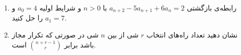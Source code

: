     \p 
\begin{enumerate}
\item
رابطه‌ی بازگشتی
$a_{n+2} - 5a_{n+1} + 6a_n = 2$
با
$n > 0$
و شرایط اولیه
$a_0 = 4$
و
$a_1 = 7$
را حل کنید.
\item
نشان دهید تعداد راه‌های انتخاب
$r$
شی از بین
$n$
شی در صورتی که تکرار مجاز باشد برابر
$\binom{n+r-1}{r}$
است.
\end{enumerate}